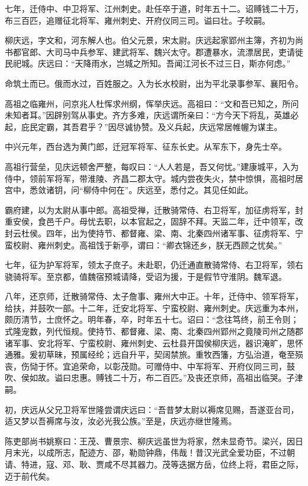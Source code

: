 \documentclass[12pt,UTF8]{ctexbook}
\begin{document}
七年，迁侍中、中卫将军、江州刺史。赴任卒于道，时年五十二。诏赙钱二十万，布三百匹，追赠征北将军、雍州刺史、开府仪同三司。谥曰壮。子皎嗣。

柳庆远，字文和，河东解人也。伯父元景，宋太尉。庆远起家郢州主簿，齐初为尚书都官郎、大司马中兵参军、建武将军、魏兴太守。郡遭暴水，流漂居民，吏请徙民祀城。庆远曰：“天降雨水，岂城之所知。吾闻江河长不过三日，斯亦何虑。”

命筑土而已。俄而水过，百姓服之。入为长水校尉，出为平北录事参军、襄阳令。

高祖之临雍州，问京兆人杜恽求州纲，恽举庆远。高祖曰：“文和吾已知之，所问未知者耳。”因辟别驾从事史。齐方多难，庆远谓所亲曰：“方今天下将乱，英雄必起，庇民定霸，其吾君乎？”因尽诚协赞。及义兵起，庆远常居帷幄为谋主。

中兴元年，西台选为黄门郎，迁冠军将军、征东长史。从军东下，身先士卒。

高祖行营垒，见庆远顿舍严整，每叹曰：“人人若是，吾又何忧。”建康城平，入为侍中，领前军将军，带淮陵、齐昌二郡太守。城内尝夜失火，禁中惊惧，高祖时居宫中，悉敛诸钥，问“柳侍中何在”。庆远至，悉付之。其见任如此。

霸府建，以为太尉从事中郎。高祖受禅，迁散骑常侍、右卫将军，加征虏将军，封重安侯，食邑千户。母忧去职，以本官起之，固辞不拜。天监二年，迁中领军，改封云杜侯。四年，出为使持节、都督雍、梁、南、北秦四州诸军事、征虏将军、宁蛮校尉、雍州刺史。高祖饯于新亭，谓曰：“卿衣锦还乡，朕无西顾之忧矣。”

七年，征为护军将军，领太子庶子。未赴职，仍迁通直散骑常侍、右卫将军，领右骁骑将军。至京都，值魏宿预城请降，受诏为援，于是假节守淮阴。魏军退。

八年，还京师，迁散骑常侍、太子詹事、雍州大中正。十年，迁侍中、领军将军，给扶，并鼓吹一部。十二年，迁安北将军、宁蛮校尉、雍州刺史。庆远重为本州，颇历清节，士庶怀之。明年春，卒，时年五十七。诏曰：“念往笃终，前王令则；式隆宠数，列代恒规。使持节、都督雍、梁、南、北秦四州郢州之竟陵司州之随郡诸军事、安北将军、宁蛮校尉、雍州刺史、云杜县开国侯柳庆远，器识淹旷，思怀通雅。爰初草昧，预属经纶；远自升平，契阔禁旅。重牧西籓，方弘治道，奄至殒丧，伤恸于怀。宜追荣命，以彰茂勋。可赠侍中、中军将军、开府仪同三司，鼓吹、侯如故。谥曰忠惠。赙钱二十万，布二百匹。”及丧还京师，高祖出临哭。子津嗣。

初，庆远从父兄卫将军世隆尝谓庆远曰：“吾昔梦太尉以褥席见赐，吾遂亚台司，适又梦以吾褥席与汝，汝必光我公族。”至是，庆远亦继世隆焉。

陈吏部尚书姚察曰：王茂、曹景宗、柳庆远虽世为将家，然未显奇节。梁兴，因日月末光，以成所志，配迹方、邵，勒勋钟鼎，伟哉！昔汉光武全爱功臣，不过朝请、特进，寇、邓、耿、贾咸不尽其器力。茂等迭据方岳，位终上将，君臣之际，迈于前代矣。
\end{document}
